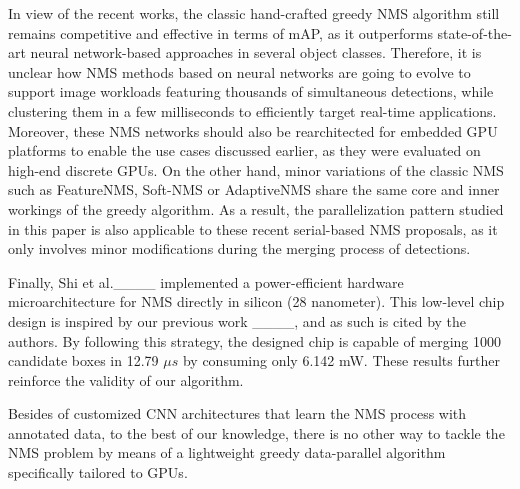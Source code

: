 In view of the recent works, the classic hand-crafted greedy NMS algorithm still remains competitive and effective in terms of mAP, as it outperforms state-of-the-art neural network-based 
approaches in several object classes. Therefore, it is unclear how NMS methods based on neural networks are going to evolve to support image workloads featuring thousands of 
simultaneous detections, while clustering them in a few milliseconds to efficiently target real-time applications. Moreover, these NMS networks should also be rearchitected for embedded 
GPU platforms to enable the use cases discussed earlier, as they were evaluated on high-end discrete GPUs. On the other hand, minor variations of the classic NMS such 
as FeatureNMS, Soft-NMS or AdaptiveNMS share the same core and inner workings of the greedy algorithm. As a result, the parallelization pattern studied in this paper is also 
applicable to these recent serial-based NMS proposals, as it only involves minor modifications during the merging process of detections.

Finally, Shi et al.____ implemented a power-efficient hardware microarchitecture for NMS directly in silicon (28 nanometer). This low-level chip design is inspired by 
our previous work ____, and as such is cited by the authors. By following this strategy, the designed chip is capable of merging 1000 candidate boxes in 12.79 $\mu s$ by consuming only 6.142 mW. These results further reinforce the validity of our algorithm. 

Besides of customized CNN architectures that learn the NMS process with annotated data, to the best of our knowledge, there is no other way to tackle the NMS problem by means of a 
lightweight greedy data-parallel algorithm specifically tailored to GPUs.